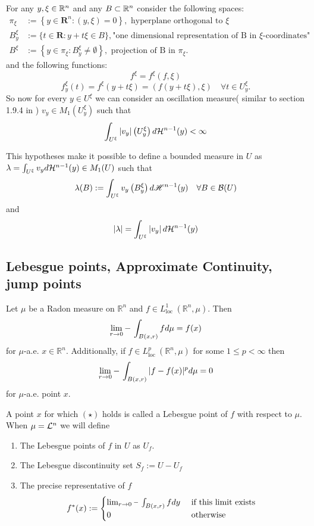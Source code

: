 For any $y,\xi\in \mathbb{R}^n$ and any $B\subset \mathbb{R}^n$ consider the following spaces:
$$
\begin{aligned}
\pi_{\xi} &:=\left\{y \in \mathbf{R}^n:(y, \xi)=0\right\}, \text{ hyperplane orthogonal to }\xi \\
B_y^{\xi} &:=\{t \in \mathbf{R}: y+t \xi \in B\}, \text{"one dimensional representation of B in } \xi  \text{-coordinates"}\\
B^{\xi} &:=\left\{y \in \pi_{\xi}: B_y^{\xi} \neq \emptyset\right\},\text{ projection of B in $\pi_\xi$} .
\end{aligned}
$$
and the following functions:
$$f^{\xi}=f^{\xi}(f, \xi)$$
$$f_y^{\xi}(t)=f^{\xi}(y+t \xi)=(f(y+t \xi), \xi) \quad \forall t \in U_y^{\xi} .$$
So now for every $y\in U^\xi$ we can consider an oscillation measure( similar to section 1.9.4 in \cite{evansGa})
$v_y\in M_1(U^\xi_y)$ such that
$$
\int_{U^{\xi}}\left|v_y\right|\left(U_y^{\xi}\right) d {\mathcal H}^{n-1}(y)< \infty
$$

This hypotheses make it possible to define a bounded measure in $U$ as $\lambda = \int_{U^\xi}v_yd{\mathcal H}^{n-1}(y)\in M_1(U)$ such that
$$
\lambda(B):=\int_{U^{\xi}} v_y\left(B_y^{\xi}\right) d \mathscr{H}^{n-1}(y) \quad \forall B \in {\mathcal B}(U)
$$
and 
$$
|\lambda| = \int_{U^{\xi}}\left|v_y\right| d {\mathcal H}^{n-1}(y)
$$

\subsection{Lebesgue points, Approximate Continuity, jump points}

\begin{theorem}
Let $\mu$ be a Radon measure on $\mathbb{R}^n$ and $f \in L_{\text {loc }}^1\left(\mathbb{R}^n, \mu\right)$. Then
$$
\lim _{r \rightarrow 0} \dashint_{B(x, r)} f d \mu=f(x)
$$
for $\mu$-a.e. $x \in \mathbb{R}^n$.
Additionally, if $f \in L_{\text {loc }}^p\left(\mathbb{R}^n, \mu\right)$ for some $1 \leq p<\infty$ then
$$
\lim _{r \rightarrow 0} \dashint_{B(x, r)}|f-f(x)|^p d \mu=0
$$
for $\mu$-a.e. point $x$.
\end{theorem}

\begin{definition}
 A point $x$ for which $(\star)$ holds is called a Lebesgue point of $f$ with respect to $\mu$. When $\mu={\mathcal L}^n$ we will define
 \begin{enumerate}
     \item The Lebesgue points of $f$ in $U$ as $U_f$.
     \item The Lebesgue discontinuity set $S_f:=U-U_f$
     \item The  precise representative of $f$
$$
f^*(x):= \begin{cases}\lim _{r \rightarrow 0} \dashint_{B(x, r)} f  d y & \text { if this limit exists } \\ 0 & \text { otherwise }\end{cases}
$$
\end{enumerate}
\end{definition}



